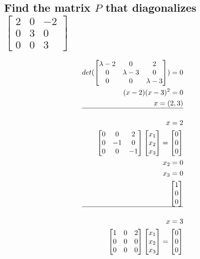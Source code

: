 \documentclass[12pt, a4paper]{article}
\begin{document}
		\subsection{Find the matrix $P$ that diagonalizes $\begin{bmatrix}2&0&-2\\0&3&0\\0&0&3\end{bmatrix}$}
			\begin{align*}
				det(\begin{bmatrix}\lambda-2&0&2\\0&\lambda-3&0\\0&0&\lambda-3\end{bmatrix})=0\\
				(x-2)(x-3)^2=0\\
				x=(2,3)\\
				\hline\\
				x=2\\
				\begin{bmatrix}0&0&2\\0&-1&0\\0&0&-1\end{bmatrix}\begin{bmatrix}x_1\\x_2\\x_3\end{bmatrix}=\begin{bmatrix}0\\0\\0\end{bmatrix}\\
				x_2=0\\
				x_3=0\\
				\begin{bmatrix}1\\0\\0\end{bmatrix}\\
				\hline\\
				x=3\\
				\begin{bmatrix}1&0&2\\0&0&0\\0&0&0\end{bmatrix}\begin{bmatrix}x_1\\x_2\\x_3\end{bmatrix}=\begin{bmatrix}0\\0\\0\end{bmatrix}\\

\end{align*}
\end{document}
